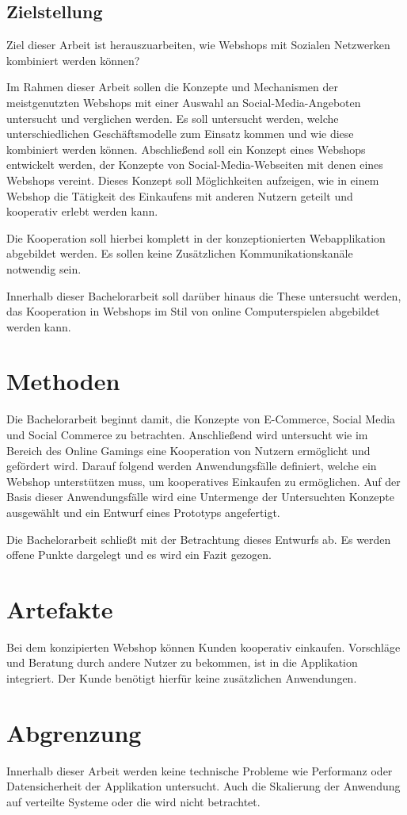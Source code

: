 \subsection{Zielstellung}

Ziel dieser Arbeit ist herauszuarbeiten, wie Webshops mit Sozialen Netzwerken kombiniert werden können?

Im Rahmen dieser Arbeit sollen die Konzepte und Mechanismen der meistgenutzten Webshops mit einer Auswahl an Social-Media-Angeboten untersucht und verglichen werden. Es soll untersucht werden, welche unterschiedlichen Geschäftsmodelle zum Einsatz kommen und wie diese kombiniert werden können. Abschließend soll ein Konzept eines Webshops entwickelt werden, der Konzepte von Social-Media-Webseiten mit denen eines Webshops vereint. Dieses Konzept soll Möglichkeiten aufzeigen, wie in einem Webshop die Tätigkeit des Einkaufens mit anderen Nutzern geteilt und kooperativ erlebt werden kann.

Die Kooperation soll hierbei komplett in der konzeptionierten Webapplikation abgebildet werden. Es sollen keine Zusätzlichen Kommunikationskanäle notwendig sein.

Innerhalb dieser Bachelorarbeit soll darüber hinaus die These untersucht werden, das Kooperation in Webshops im Stil von online Computerspielen abgebildet werden kann.


\section{Methoden}

Die Bachelorarbeit beginnt damit, die Konzepte von E-Commerce, Social Media und Social Commerce zu betrachten. Anschließend wird untersucht wie im Bereich des Online Gamings eine Kooperation von Nutzern ermöglicht und gefördert wird. Darauf folgend werden Anwendungsfälle definiert, welche ein Webshop unterstützen muss, um kooperatives Einkaufen zu ermöglichen. Auf der Basis dieser Anwendungsfälle wird eine Untermenge der Untersuchten Konzepte ausgewählt und ein Entwurf eines Prototyps angefertigt.

Die Bachelorarbeit schließt mit der Betrachtung dieses Entwurfs ab. Es werden offene Punkte dargelegt und es wird ein Fazit gezogen.


\section{Artefakte}

Bei dem konzipierten Webshop können Kunden kooperativ einkaufen. Vorschläge und Beratung durch andere Nutzer zu bekommen, ist in die Applikation integriert. Der Kunde benötigt hierfür keine zusätzlichen Anwendungen.


\section{Abgrenzung}

Innerhalb dieser Arbeit werden keine technische Probleme wie Performanz oder Datensicherheit der Applikation untersucht. Auch die Skalierung der Anwendung auf verteilte Systeme oder die  wird nicht betrachtet.
